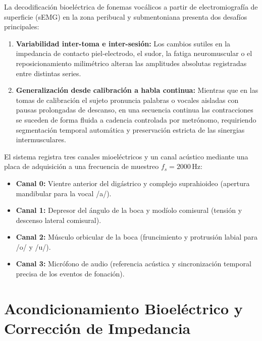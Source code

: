 \documentclass[11pt,a4paper,openany]{book}
\theoremstyle{definition}
\begin{document}
La decodificación bioeléctrica de fonemas vocálicos a partir de electromiografía de superficie (sEMG) en la zona peribucal y submentoniana presenta dos desafíos principales:
\begin{enumerate}
    \item \textbf{Variabilidad inter-toma e inter-sesión:} Los cambios sutiles en la impedancia de contacto piel-electrodo, el sudor, la fatiga neuromuscular o el reposicionamiento milimétrico alteran las amplitudes absolutas registradas entre distintas series.
    \item \textbf{Generalización desde calibración a habla continua:} Mientras que en las tomas de calibración el sujeto pronuncia palabras o vocales aisladas con pausas prolongadas de descanso, en una secuencia continua las contracciones se suceden de forma fluida a cadencia controlada por metrónomo, requiriendo segmentación temporal automática y preservación estricta de las sinergias intermusculares.
\end{enumerate}

El sistema registra tres canales mioeléctricos y un canal acústico mediante una placa de adquisición a una frecuencia de muestreo $f_s = 2000\,\text{Hz}$:
\begin{itemize}
    \item \textbf{Canal 0:} Vientre anterior del digástrico y complejo suprahioideo (apertura mandibular para la vocal /a/).
    \item \textbf{Canal 1:} Depresor del ángulo de la boca y modíolo comisural (tensión y descenso lateral comisural).
    \item \textbf{Canal 2:} Músculo orbicular de la boca (fruncimiento y protrusión labial para /o/ y /u/).
    \item \textbf{Canal 3:} Micrófono de audio (referencia acústica y sincronización temporal precisa de los eventos de fonación).
\end{itemize}

\section{Acondicionamiento Bioeléctrico y Corrección de Impedancia}
\label{sec:acondicionamiento}
\end{document}
